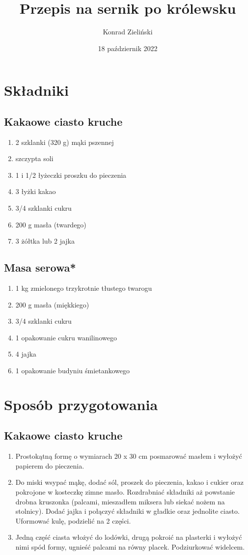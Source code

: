 \documentclass[12pt, a4paper, titlepage]{article}
\title {Przepis na sernik po królewsku}
\author {Konrad Zieliński}
\date {18 październik 2022}
\begin{document}
\maketitle
\section{Składniki}
\subsection{Kakaowe ciasto kruche}
\begin{enumerate}[-]
\item 2 szklanki (320 g) mąki pszennej
\item szczypta soli
\item 1 i 1/2 łyżeczki proszku do pieczenia
\item 3 łyżki kakao
\item 3/4 szklanki cukru
\item 200 g masła (twardego)
\item 3 żółtka lub 2 jajka
\end{enumerate}
\subsection{Masa serowa*}
\begin{enumerate}[-]
\item 1 kg zmielonego trzykrotnie tłustego twarogu
\item 200 g masła (miękkiego)
\item 3/4 szklanki cukru
\item 1 opakowanie cukru wanilinowego
\item 4 jajka
\item 1 opakowanie budyniu śmietankowego
\end{enumerate}
\section{Sposób przygotowania}
\subsection{Kakaowe ciasto kruche}
\begin{enumerate}[-]
\item Prostokątną formę o wymiarach 20 x 30 cm posmarować masłem i wyłożyć papierem do pieczenia.

\item Do miski wsypać mąkę, dodać sól, proszek do pieczenia, kakao i cukier oraz pokrojone w kosteczkę zimne masło. Rozdrabniać składniki aż powstanie drobna kruszonka (palcami, mieszadłem miksera lub siekać nożem na stolnicy). Dodać jajka i połączyć składniki w gładkie oraz jednolite ciasto. Uformować kulę, podzielić na 2 części.

\item Jedną część ciasta włożyć do lodówki, drugą pokroić na plasterki i wyłożyć nimi spód formy, ugnieść palcami na równy placek. Podziurkować widelcem.
\end{enumerate}
\end{document}
